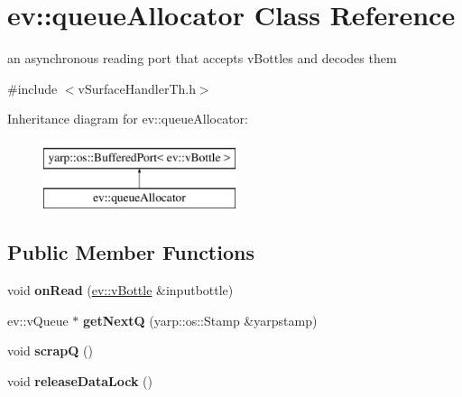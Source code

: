 \hypertarget{classev_1_1queueAllocator}{}\section{ev\+:\+:queue\+Allocator Class Reference}
\label{classev_1_1queueAllocator}


an asynchronous reading port that accepts v\+Bottles and decodes them  




{\ttfamily \#include $<$v\+Surface\+Handler\+Th.\+h$>$}

Inheritance diagram for ev\+:\+:queue\+Allocator\+:\begin{figure}[H]
\begin{center}
\leavevmode
\includegraphics[height=2.000000cm]{classev_1_1queueAllocator}
\end{center}
\end{figure}
\subsection*{Public Member Functions}
\begin{DoxyCompactItemize}
\item 
void {\bfseries on\+Read} (\hyperlink{classev_1_1vBottle}{ev\+::v\+Bottle} \&inputbottle)\hypertarget{classev_1_1queueAllocator_a12ae388a8d2deb71ca5b927c3eb0a860}{}\label{classev_1_1queueAllocator_a12ae388a8d2deb71ca5b927c3eb0a860}

\item 
ev\+::v\+Queue $\ast$ {\bfseries get\+NextQ} (yarp\+::os\+::\+Stamp \&yarpstamp)\hypertarget{classev_1_1queueAllocator_a2429870a8dd1a2e1b71853bdc7a50bde}{}\label{classev_1_1queueAllocator_a2429870a8dd1a2e1b71853bdc7a50bde}

\item 
void {\bfseries scrapQ} ()\hypertarget{classev_1_1queueAllocator_a1a914bc39f534dc50a7eb2ba846753bf}{}\label{classev_1_1queueAllocator_a1a914bc39f534dc50a7eb2ba846753bf}

\item 
void {\bfseries release\+Data\+Lock} ()\hypertarget{classev_1_1queueAllocator_aa3ab79f1da7f2930811ab980347b0305}{}\label{classev_1_1queueAllocator_aa3ab79f1da7f2930811ab980347b0305}

\end{DoxyCompactItemize}


